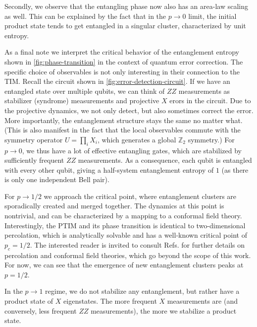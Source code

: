 Secondly, we observe that the entangling phase now also has an area-law scaling
as well. This can be explained by the fact that in the $p\to 0$ limit, the
initial product state tends to get entangled in a singular cluster,
characterized by unit entropy.

As a final note we interpret the critical behavior of the entanglement entropy
shown in \cref{fig:phase-transition} in the context of
quantum error correction. The specific choice of observables is not only
interesting in their connection to the TIM. Recall the circuit shown in
\cref{fig:error-detection-circuit}. If we have an entangled state over multiple
qubits, we can think of $ZZ$ measurements as stabilizer (syndrome) measurements
and projective $X$ erors in the circuit. Due to the projective dynamics, we not
only detect, but also sometimes correct the error. More importantly, the
entanglement structure stays the same no matter what. (This is also manifest in
the fact that the local observables commute with the symmetry operator
$U=\prod_i X_i$, which generates a global $\mathbb{Z}_2$ symmetry.) For $p\to
0$, we thus have a lot of effective entangling gates, which are stabilized by
sufficiently frequent $ZZ$ measurements. As a consequence, each qubit is
entangled with every other qubit, giving a half-system entanglement entropy of
$1$ (as there is only one independent Bell pair).

For $p \to 1 /2$ we approach the critical point,
where entanglement clusters are sporadically created and merged together. The
dynamics at this point is nontrivial, and can be characterized by a mapping to
a conformal field theory. Interestingly, the PTIM and its phase transition is
identical to two-dimensional percolation, which is analytically solvable and has a
well-known critical point of $p_c = 1 /2$. The interested reader is invited to
consult Refs.
\cite{aharonyIntroductionPercolationTheory2017,difrancescoConformalFieldTheory1997}
for further details on percolation and conformal field theories, which go
beyond the scope of this work. For now, we can see that the emergence of new
entanglement clusters peaks at $p = 1 /2$.

In the $p\to 1$ regime, we do not stabilize any entanglement, but rather
have a product state of $X$ eigenstates. The more frequent $X$ measurements are
(and conversely, less frequent $ZZ$ measurements), the more we stabilize a
product state.


